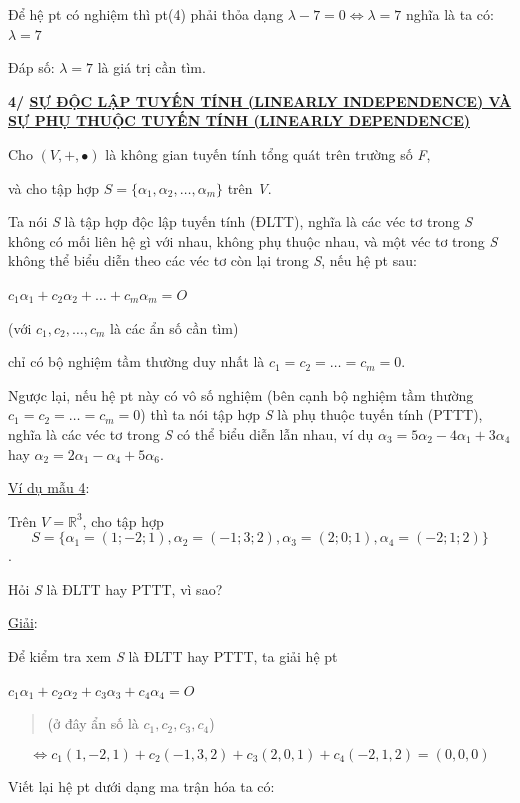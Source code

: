\documentclass[12pt,a4paper]{article}
\begin{document}
Để hệ pt có nghiệm thì pt(4) phải thỏa dạng
$\lambda - 7 = 0 \Leftrightarrow \lambda = 7$ nghĩa là ta
có: $\lambda = 7$

Đáp số: $\lambda = 7$ là giá
trị cần tìm.

\textbf{4/ \ul{SỰ ĐỘC LẬP TUYẾN TÍNH (LINEARLY INDEPENDENCE) VÀ SỰ PHỤ
THUỘC TUYẾN TÍNH (LINEARLY DEPENDENCE)}}

Cho $(V, +, \bullet)$ là không
gian tuyến tính tổng quát trên trường số \emph{F},

và cho tập hợp $S = \{\alpha_1, \alpha_2, \dots, \alpha_m\}$
trên \emph{V}.

Ta nói \emph{S} là tập hợp độc lập tuyến tính (ĐLTT), nghĩa là các véc
tơ trong \emph{S} không có mối liên hệ gì với nhau, không phụ thuộc
nhau, và một véc tơ trong \emph{S} không thể biểu diễn theo các véc tơ
còn lại trong \emph{S}, nếu hệ pt sau:

$c_1\alpha_1 + c_2\alpha_2 + \dots + c_m\alpha_m = O$

(với $c_1, c_2, \dots, c_m$ là các ẩn
số cần tìm)

chỉ có bộ nghiệm tầm thường duy nhất là
$c_1 = c_2 = \dots = c_m = 0$.

Ngược lại, nếu hệ pt này có vô số nghiệm (bên cạnh bộ nghiệm tầm thường
$c_1 = c_2 = \dots = c_m = 0$) thì ta nói
tập hợp \emph{S} là phụ thuộc tuyến tính (PTTT), nghĩa là các véc tơ
trong \emph{S} có thể biểu diễn lẫn nhau, ví dụ
$\alpha_3 = 5\alpha_2 - 4\alpha_1 + 3\alpha_4$ hay
$\alpha_2 = 2\alpha_1 - \alpha_4 + 5\alpha_6$.

\ul{Ví dụ mẫu 4}:

Trên $V = \mathbb{R}^3$, cho tập
hợp \[ S = \{\alpha_1 = (1; -2; 1), \alpha_2 = (-1; 3; 2), \alpha_3 = (2; 0; 1), \alpha_4 = (-2; 1; 2)\} \].

Hỏi \emph{S} là ĐLTT hay PTTT, vì sao?

\ul{Giải}:

Để kiểm tra xem \emph{S} là ĐLTT hay PTTT, ta giải hệ pt

$c_1\alpha_1 + c_2\alpha_2 + c_3\alpha_3 + c_4\alpha_4 = O$

\begin{quote}
(ở đây ẩn số là
$c_1, c_2, c_3, c_4$)
\end{quote}

\[ \Leftrightarrow c_1(1, -2, 1) + c_2(-1, 3, 2) + c_3(2, 0, 1) + c_4(-2, 1, 2) = (0, 0, 0) \]

Viết lại hệ pt dưới dạng ma trận hóa ta có:
\end{document}

